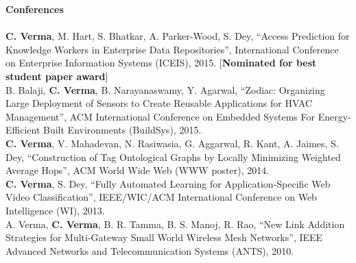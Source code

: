 \documentclass[12pt]{ucsddissertation}
\newcommand{\comment}[1]{}
\begin{document}
\begin{vita}
{\noindent\textbf{Conferences} \\ \\
\noindent \textbf{C. Verma}, M. Hart, S. Bhatkar, A. Parker-Wood, S. Dey, ``Access Prediction for Knowledge Workers in Enterprise Data Repositories'', International Conference on Enterprise Information Systems (ICEIS), 2015. [\textbf{Nominated for best student paper award}] \\

\noindent B. Balaji, \textbf{C. Verma}, B. Narayanaswamy, Y. Agarwal, ``Zodiac: Organizing Large Deployment of Sensors to Create Reusable Applications for HVAC Management'', ACM International Conference on Embedded Systems For Energy-Efficient Built Environments (BuildSys), 2015. \\

\noindent \textbf{C. Verma}, V. Mahadevan, N. Rasiwasia, G. Aggarwal, R. Kant, A. Jaimes, S. Dey, ``Construction of Tag Ontological Graphs by Locally Minimizing Weighted Average Hops'', ACM World Wide Web (WWW poster), 2014. \\ 


\noindent \textbf{C. Verma}, S. Dey, ``Fully Automated Learning for Application-Specific Web Video Classification'', IEEE/WIC/ACM International Conference on Web Intelligence (WI), 2013. \\ 

\noindent A. Verma, \textbf{C. Verma}, B. R. Tamma, B. S. Manoj, R. Rao, ``New Link Addition Strategies for Multi-Gateway Small World Wireless Mesh Networks'', IEEE Advanced Networks and  Telecommunication Systems (ANTS), 2010. 

}

\comment{

\fieldsofstudy
\noindent Major Field: Engineering (Specialization or Focused Studies)
\vskip\baselineskip
Studies in Applied Mathematics\par
Professors Alpha Beta and Gamma Delta
\vskip\baselineskip
Studies in Mechanices\par
Professors Epsilon Zeta and Eta Theta
\vskip\baselineskip
Studies in Electromagnetism\par
Professors Iota Kappa and Lambda Mu

}
\end{vita}
\end{document}
